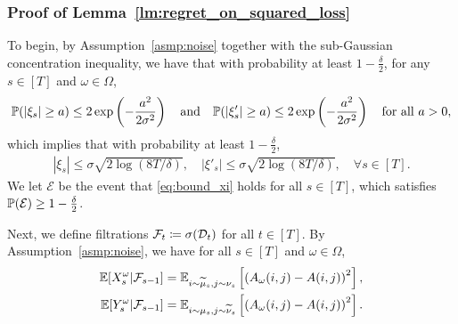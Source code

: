 \subsubsection{Proof of Lemma~\ref{lm:regret_on_squared_loss}}

To begin, by Assumption~\ref{asmp:noise} together with the sub-Gaussian concentration inequality, we  have that with probability at least $1-\frac{\delta}{2}$, for any $s\in[T]$ and $\omega\in\Omega$,
\begin{align*}
    \PP(|\xi_s|\geq a)\leq 2\exp\left(-\frac{a^2}{2\sigma^2}\right)\quad\text{and}\quad \PP(|\xi'_s|\geq a)\leq 2\exp\left(-\frac{a^2}{2\sigma^2}\right)
    \quad\text{for all }a>0,%
\end{align*}
which implies that with probability at least $1-\frac{\delta}{2}$,
\begin{align}\label{eq:bound_xi}
    |\xi_s|\leq \sigma\sqrt{2\log(8T/\delta)},\quad |\xi'_s|\leq \sigma\sqrt{2\log(8T/\delta)},\quad\forall s\in[T].
\end{align} 
We let  $\mathcal{E}$ be the event that \eqref{eq:bound_xi} holds for all $s\in[T]$, which satisfies ${\mathbb P}(\mathcal{E})\geq 1-\frac{\delta}{2}$. 


Next, we define filtrations ${\mathcal{F}}_t\coloneqq \sigma({\mathcal{D}}_{t})$ for all $t\in[T]$. By Assumption~\ref{asmp:noise}, we have for all $s\in[T]$ and $\omega\in\Omega$,
\begin{align}
    \mathbb{E}[X_s^\omega|  {\mathcal{F}}_{s-1}]&=\mathbb{E}_{i\sim\widetilde{\mu}_s,j\sim\nu_s}\left[\left(A_\omega(i,j)-A(i,j)\right)^2\right],\label{eq:conditional_expectation_X}\\
    \mathbb{E}[Y_s^\omega|{\mathcal{F}}_{s-1}]&=\mathbb{E}_{i\sim\mu_s,j\sim\widetilde{\nu}_s}\left[\left(A_\omega(i,j)-A(i,j)\right)^2\right]\label{eq:conditional_expectation_Y}.
\end{align}

